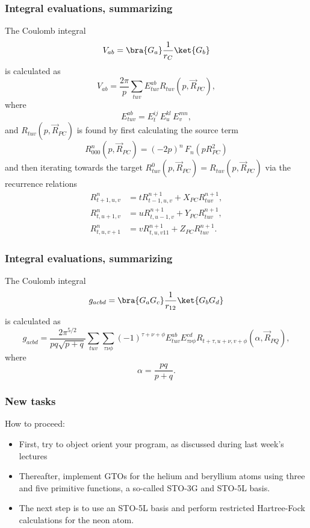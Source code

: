 \frame
{
  \frametitle{Integral evaluations, summarizing}
\begin{small}
{\scriptsize
The Coulomb integral
\begin{equation}
 V_{ab} = \bra{G_a}\frac{1}{r_C}\ket{G_b}
\end{equation}
is calculated as
\begin{equation}
 V_{ab} = \frac{2\pi}{p}\sum_{tuv}E^{ab}_{tuv} R_{tuv}(p,\vec R_{PC}),
\end{equation}
where
\begin{equation}
 E^{ab}_{tuv} = E^{ij}_t\,E^{kl}_u\,E^{mn}_v,
\end{equation}
and $R_{tuv}(p,\vec R_{PC})$ is found by first calculating the source term
\begin{equation}
 R^n_{000}(p,\vec R_{PC}) = (-2p)^n\,F_n(p R^2_{PC})
\end{equation}
and then iterating towards the target $R^0_{tuv}(p,\vec R_{PC}) = R_{tuv}(p,\vec R_{PC})$ via the recurrence relations
\begin{equation}
 \begin{split}
  R^n_{t+1,u,v} & = tR^{n+1}_{t-1,u,v} + X_{PC} R^{n+1}_{tuv}, \\
  R^n_{t,u+1,v} & = uR^{n+1}_{t,u-1,v} + Y_{PC} R^{n+1}_{tuv}, \\
  R^n_{t,u,v+1} & = vR^{n+1}_{t,u,v11} + Z_{PC} R^{n+1}_{tuv}.
 \end{split}
\end{equation}
}
\end{small}
}
\frame
{
  \frametitle{Integral evaluations, summarizing}
\begin{small}
{\scriptsize
The Coulomb integral
\begin{equation}
 g_{acbd} = \bra{G_a G_c}\frac{1}{r_{12}}\ket{G_b G_d}
\end{equation}
is calculated as
\begin{equation}
 g_{acbd} = \frac{2\pi^{5/2}}{pq\sqrt{p+q}}\sum_{tuv}\sum_{\tau\nu\phi}(-1)^{\tau+\nu+\phi}E^{ab}_{tuv}E^{cd}_{\tau\nu\phi}R_{t+\tau,u+\nu,v+\phi}(\alpha,\vec R_{PQ}),
\end{equation}
where
\begin{equation}
  \alpha = \frac{pq}{p + q}.
\end{equation}
}
\end{small}
}

\frame
{
  \frametitle{New tasks}
How to proceed:
\begin{itemize}
\item First, try to object orient your program, as discussed during last week's lectures
\item Thereafter, implement GTOs for the helium and beryllium atoms using three and five primitive functions, a so-called STO-3G and STO-5L basis.
\item The next step is to use an STO-5L basis and perform restricted Hartree-Fock calculations for the neon atom.
\end{itemize}
}

